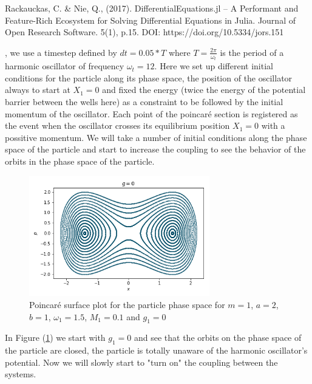 Rackauckas, C. & Nie, Q., (2017). DifferentialEquations.jl – A Performant and Feature-Rich Ecosystem for Solving Differential Equations in Julia. Journal of Open Research Software. 5(1), p.15. DOI: https://doi.org/10.5334/jors.151

, we use a timestep defined by $dt=0.05*T$ where $T=\frac{2\pi}{\omega_t}$ is the period of a harmonic oscillator of frequency $\omega_t=12$. Here we set up different initial conditions for the particle along its phase space, the position of the oscillator always to start at $X_1=0$ and fixed the energy (twice the energy of the potential barrier between the wells here) as a constraint to be followed by the initial momentum of the oscillator. Each point of the poincaré section is registered as the event when the oscillator crosses its equilibrium position $X_1=0$ with a possitive momentum. We will take a number of initial conditions along the phase space of the particle and start to increase the coupling to see the behavior of the orbits in the phase space of the particle.

\begin{figure}[H]
\centering
\includegraphics[width=0.7\textwidth]{Figures/poincare_g0.png}
\caption{Poincaré surface plot for the particle phase space for $m=1$, $a=2$, $b=1$, $\omega_1=1.5$, $M_1=0.1$ and $g_1=0$\label{fig:poinc_g0}
}
\end{figure}

In Figure (\ref{fig:poinc_g0}) we start with $g_1=0$ and see that the orbits on the phase space of the particle are closed, the particle is totally unaware of the harmonic oscillator's potential. Now we will slowly start to "turn on" the coupling between the systems.\par 


